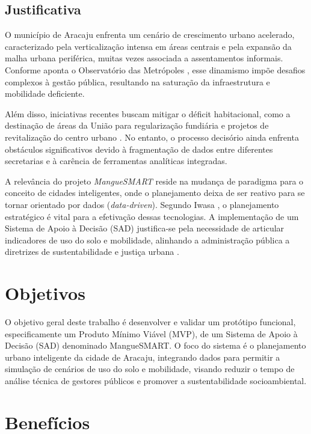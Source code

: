 \documentclass[12pt]{article}
\begin{document}
\subsection{Justificativa}
\label{sec:justificativa}
O município de Aracaju enfrenta um cenário de crescimento urbano acelerado, caracterizado pela verticalização intensa em áreas centrais e pela expansão da malha urbana periférica, muitas vezes associada a assentamentos informais. Conforme aponta o Observatório das Metrópoles \cite{observatorio2023}, esse dinamismo impõe desafios complexos à gestão pública, resultando na saturação da infraestrutura e mobilidade deficiente.

Além disso, iniciativas recentes buscam mitigar o déficit habitacional, como a destinação de áreas da União para regularização fundiária \cite{agenciagov2025} e projetos de revitalização do centro urbano \cite{govse2025}. No entanto, o processo decisório ainda enfrenta obstáculos significativos devido à fragmentação de dados entre diferentes secretarias e à carência de ferramentas analíticas integradas.

A relevância do projeto \textit{MangueSMART} reside na mudança de paradigma para o conceito de cidades inteligentes, onde o planejamento deixa de ser reativo para se tornar orientado por dados (\textit{data-driven}). Segundo Iwasa \cite{iwasa2025}, o planejamento estratégico é vital para a efetivação dessas tecnologias. A implementação de um Sistema de Apoio à Decisão (SAD) justifica-se pela necessidade de articular indicadores de uso do solo e mobilidade, alinhando a administração pública a diretrizes de sustentabilidade e justiça urbana \cite{rdc2024}.

\section{Objetivos} 
O objetivo geral deste trabalho é desenvolver e validar um protótipo funcional, especificamente um Produto Mínimo Viável (MVP), de um Sistema de Apoio à Decisão (SAD) denominado MangueSMART. O foco do sistema é o planejamento urbano inteligente da cidade de Aracaju, integrando dados para permitir a simulação de cenários de uso do solo e mobilidade, visando reduzir o tempo de análise técnica de gestores públicos e promover a sustentabilidade socioambiental.

\section{Benefícios} 
\end{document}
